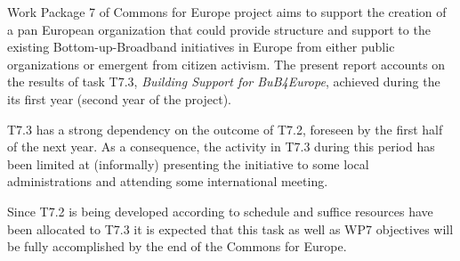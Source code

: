 Work Package 7 of Commons for Europe project aims to support the creation of a pan European organization that could provide structure and support to the existing Bottom-up-Broadband initiatives in Europe from either public organizations or emergent from citizen activism. The present report accounts on the results of task T7.3, \emph{Building Support for BuB4Europe}, achieved during the its first year (second year of the project). 

T7.3 has a strong dependency on the outcome of T7.2, foreseen by the first half of the next year. As a consequence, the activity in T7.3 during this period has been limited at (informally) presenting the initiative to some local administrations and attending some international meeting.

Since T7.2 is being developed according to schedule and suffice resources have been allocated to T7.3 it is expected that this task  as well as WP7 objectives will be fully accomplished by the end of the Commons for Europe.